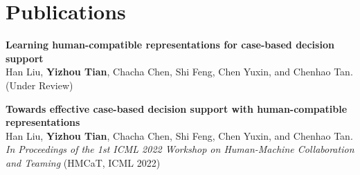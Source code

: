 
\section{Publications}



\textbf{Learning human-compatible representations for case-based decision support}
\\
Han Liu, \textbf{Yizhou Tian}, Chacha Chen, Shi Feng, Chen Yuxin, and Chenhao Tan. (Under Review)
\vspace{1mm}
        

\textbf{Towards effective case-based decision support with human-compatible representations} 
\href{https://drive.google.com/file/d/1Jo_UxAb69B-v5oqET8-qjzQIvDsXt-fF/view}
{\faExternalLink}\\
Han Liu, \textbf{Yizhou Tian}, Chacha Chen, Shi Feng, Chen Yuxin, and Chenhao Tan. \textit{In Proceedings of the 1st ICML 2022 Workshop on Human-Machine Collaboration and Teaming} (HMCaT, ICML 2022) 
\vspace{1mm}
